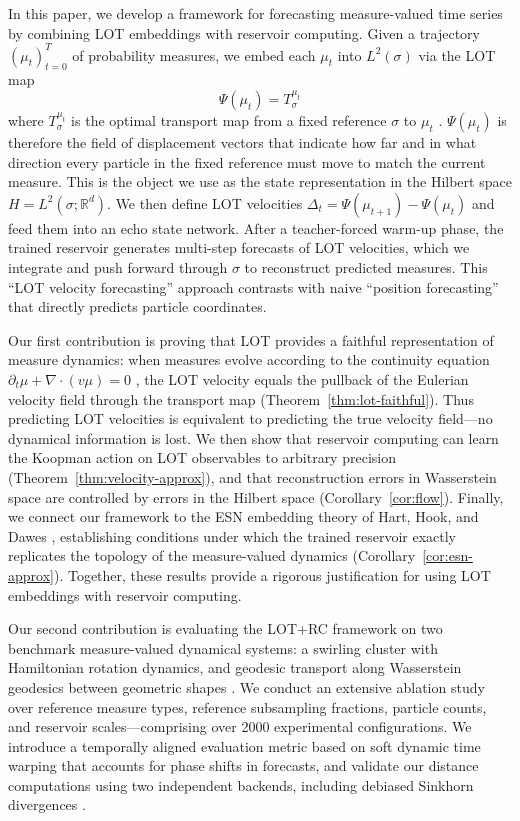 \documentclass[11pt]{article}
\newcommand{\1}{\mathbf{1}}
\begin{document}
In this paper, we develop a framework for forecasting measure-valued time series by combining LOT embeddings with reservoir computing. Given a trajectory $(\mu_t)_{t=0}^T$ of probability measures, we embed each $\mu_t$ into $L^2(\sigma)$ via the LOT map
\[
\Psi(\mu_t) = T_\sigma^{\mu_t}
\]
where $T_\sigma^{\mu_t}$ is the optimal transport map from a fixed reference $\sigma$ to $\mu_t$ \cite{brenier1991polar,ambrosio2008gradient}. $\Psi(\mu_t)$ is therefore the field of displacement vectors that indicate how far and in what direction every particle in the fixed reference must move to match the current measure. This is the object we use as the state representation in the Hilbert space $H = L^2(\sigma; \mathbb{R}^d)$. We then define LOT velocities $\Delta_t = \Psi(\mu_{t+1}) - \Psi(\mu_t)$ and feed them into an echo state network. After a teacher-forced warm-up phase, the trained reservoir generates multi-step forecasts of LOT velocities, which we integrate and push forward through $\sigma$ to reconstruct predicted measures. This ``LOT velocity forecasting'' approach contrasts with naive ``position forecasting'' that directly predicts particle coordinates.

Our first contribution is proving that LOT provides a faithful representation of measure dynamics: when measures evolve according to the continuity equation $\partial_t \mu + \nabla \cdot (v\mu) = 0$ \cite{ambrosio2008gradient,otto2001geometry}, the LOT velocity equals the pullback of the Eulerian velocity field through the transport map (Theorem~\ref{thm:lot-faithful}). Thus predicting LOT velocities is equivalent to predicting the true velocity field---no dynamical information is lost. We then show that reservoir computing can learn the Koopman action on LOT observables to arbitrary precision (Theorem~\ref{thm:velocity-approx}), and that reconstruction errors in Wasserstein space are controlled by errors in the Hilbert space (Corollary~\ref{cor:flow}). Finally, we connect our framework to the ESN embedding theory of Hart, Hook, and Dawes \cite{Hart_2020}, establishing conditions under which the trained reservoir exactly replicates the topology of the measure-valued dynamics (Corollary~\ref{cor:esn-approx}). Together, these results provide a rigorous justification for using LOT embeddings with reservoir computing.

Our second contribution is evaluating the LOT+RC framework on two benchmark measure-valued dynamical systems: a swirling cluster with Hamiltonian rotation dynamics, and geodesic transport along Wasserstein geodesics between geometric shapes \cite{bonneel2011displacement}. We conduct an extensive ablation study over reference measure types, reference subsampling fractions, particle counts, and reservoir scales---comprising over 2000 experimental configurations. We introduce a temporally aligned evaluation metric based on soft dynamic time warping \cite{cuturi2017soft} that accounts for phase shifts in forecasts, and validate our distance computations using two independent backends, including debiased Sinkhorn divergences \cite{feydy2019interpolating,cuturi2013sinkhorn}. 
\end{document}
